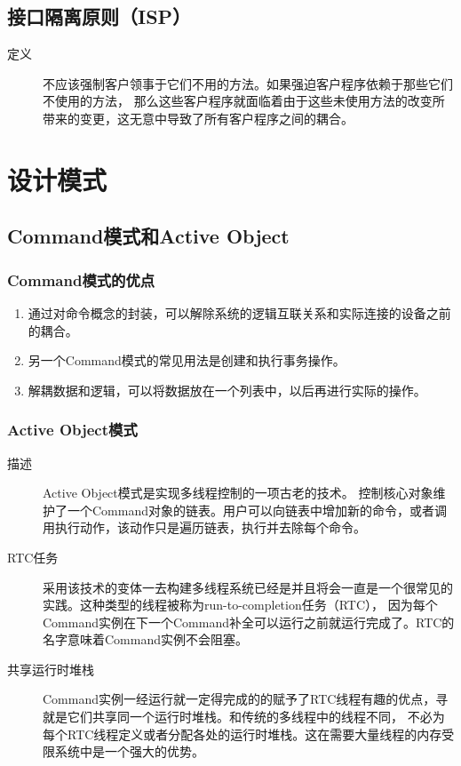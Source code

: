 \documentclass[11pt]{article}
\begin{document}
\subsection{接口隔离原则（ISP）}
\label{sec:org7347ce9}
\begin{description}
\item[{定义}] 不应该强制客户领事于它们不用的方法。如果强迫客户程序依赖于那些它们不使用的方法，
那么这些客户程序就面临着由于这些未使用方法的改变所带来的变更，这无意中导致了所有客户程序之间的耦合。
\end{description}
\section{设计模式}
\label{sec:org84b4395}
\subsection{Command模式和Active Object}
\label{sec:org07c5bac}
\subsubsection{Command模式的优点}
\label{sec:orgb099ef8}
\begin{enumerate}
\item 通过对命令概念的封装，可以解除系统的逻辑互联关系和实际连接的设备之前的耦合。
\item 另一个Command模式的常见用法是创建和执行事务操作。
\item 解耦数据和逻辑，可以将数据放在一个列表中，以后再进行实际的操作。
\end{enumerate}
\subsubsection{Active Object模式}
\label{sec:orgf50beff}
\begin{description}
\item[{描述}] Active Object模式是实现多线程控制的一项古老的技术。
控制核心对象维护了一个Command对象的链表。用户可以向链表中增加新的命令，或者调用执行动作，该动作只是遍历链表，执行并去除每个命令。
\item[{RTC任务}] 采用该技术的变体一去构建多线程系统已经是并且将会一直是一个很常见的实践。这种类型的线程被称为run-to-completion任务（RTC），
因为每个Command实例在下一个Command补全可以运行之前就运行完成了。RTC的名字意味着Command实例不会阻塞。
\item[{共享运行时堆栈}] Command实例一经运行就一定得完成的的赋予了RTC线程有趣的优点，寻就是它们共享同一个运行时堆栈。和传统的多线程中的线程不同，
不必为每个RTC线程定义或者分配各处的运行时堆栈。这在需要大量线程的内存受限系统中是一个强大的优势。
\end{description}
\end{document}
